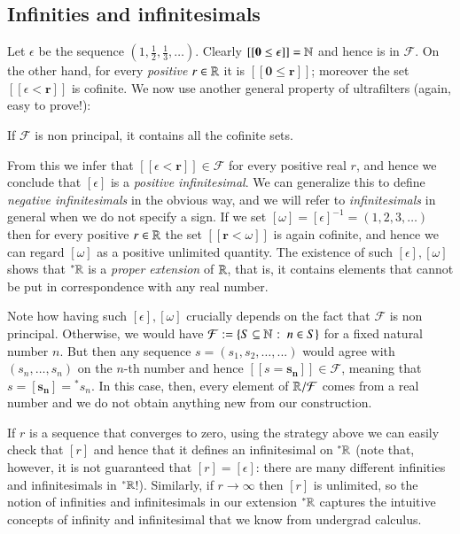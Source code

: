 \documentclass[adraft, copyright,creativecommons,sharealike,noncommercial]{Preambles/eptcs}
\newcommand{\nstar}{{^*}}
\begin{document}
\subsection{Infinities and infinitesimals}
Let $\epsilon$ be the sequence $(1, \frac{1}{2}, \frac{1}{3}, \dots)$.
Clearly $[[\mathbf{0} \leq \epsilon]] = \mathbb{N}$ and hence is in $\mathcal{F}$. On the other hand, for every \emph{positive} $r \in \mathbb{R}$ it is $[[\mathbf{0} \leq \mathbf{r}]]$; moreover the set $[[\epsilon < \mathbf{r}]]$ is cofinite. We now use another general property of ultrafilters (again, easy to prove!):
\begin{center}
	If $\mathcal{F}$ is non principal, it contains all the cofinite sets.
\end{center}
From this we infer that $[[\epsilon < \mathbf{r}]] \in \mathcal{F}$ for every positive real $r$, and hence we conclude that $[\epsilon]$ is a \emph{positive infinitesimal}. We can generalize this to define \emph{negative infinitesimals} in the obvious way, and we will refer to \emph{infinitesimals} in general when we do not specify a sign. If we set $[\omega] = [\epsilon]^{-1} = (1,2,3,\dots)$ then for every positive $r \in \mathbb{R}$ the set $[[\mathbf{r} < \omega]]$ is again cofinite, and hence we can regard $[\omega]$ as a positive unlimited quantity. The existence of such $[\epsilon], [\omega]$ shows that $\nstar \reals$ is a \emph{proper extension} of $\mathbb{R}$, that is, it contains elements that cannot be put in correspondence with any real number.
\begin{remark}
	Note how having such $[\epsilon], [\omega]$ crucially depends on the fact that $\mathcal{F}$ is non principal. Otherwise, we would have $\mathcal{F}:= \left\{S \subseteq \mathbb{N} \: \colon \: n \in S\right\}$ for a fixed natural number $n$. But then any sequence $s = (s_1, s_2, \dots, ...)$ would agree with $(s_n, \dots, s_n)$ on the $n$-th number and hence $[[s = \mathbf{s_n}]] \in \mathcal{F}$, meaning that $s = [\mathbf{s_n}] = \nstar s_n$. In this case, then, every element of $\mathbb{R}/\mathcal{F}$ comes from a real number and we do not obtain anything new from our construction.
\end{remark}
%
If $r$ is a sequence that converges to zero, using the strategy above we can easily check that $[r]$ and hence that it defines an infinitesimal on $\nstar \reals$ (note that, however, it is not guaranteed that $[r] = [\epsilon]$: there are many different infinities and infinitesimals in $\nstar \reals$!). Similarly, if $r \to \infty$ then $[r]$ is unlimited, so the notion of infinities and infinitesimals in our extension $\nstar \reals$ captures the intuitive concepts of infinity and infinitesimal that we know from undergrad calculus. 
\end{document}
